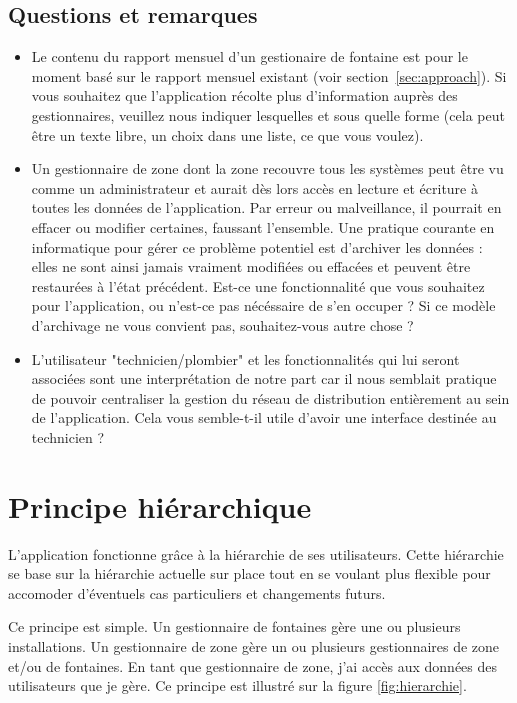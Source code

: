 \documentclass[a4paper, 11pt]{article}
\begin{document}
  \subsection{Questions et remarques}
  \begin{itemize}
    \item Le contenu du rapport mensuel d'un gestionaire de fontaine est pour le moment basé sur le rapport mensuel existant (voir section~\ref{sec:approach}). Si vous souhaitez que l'application récolte plus d'information auprès des gestionnaires, veuillez nous indiquer lesquelles et sous quelle forme (cela peut être un texte libre, un choix dans une liste, ce que vous voulez).
    \item Un gestionnaire de zone dont la zone recouvre tous les systèmes peut être vu comme un administrateur et aurait dès lors accès en lecture et écriture à toutes les données de l'application. Par erreur ou malveillance, il pourrait en effacer ou modifier certaines, faussant l'ensemble. Une pratique courante en informatique pour gérer ce problème potentiel est d'archiver les données : elles ne sont ainsi jamais vraiment modifiées ou effacées et peuvent être restaurées à l'état précédent. Est-ce une fonctionnalité que vous souhaitez pour l'application, ou n'est-ce pas nécéssaire de s'en occuper ? Si ce modèle d'archivage ne vous convient pas, souhaitez-vous autre chose ?
    \item L'utilisateur "technicien/plombier" et les fonctionnalités qui lui seront associées sont une interprétation de notre part car il nous semblait pratique de pouvoir centraliser la gestion du réseau de distribution entièrement au sein de l'application. Cela vous semble-t-il utile d'avoir une interface destinée au technicien ?
  \end{itemize}

  \section{Principe hiérarchique}
    L'application fonctionne grâce à la hiérarchie de ses utilisateurs. Cette hiérarchie se base sur la hiérarchie actuelle sur place tout en se voulant plus flexible pour accomoder d'éventuels cas particuliers et changements futurs.

    Ce principe est simple. Un gestionnaire de fontaines gère une ou plusieurs installations. Un gestionnaire de zone gère un ou plusieurs gestionnaires de zone et/ou de fontaines. En tant que gestionnaire de zone, j'ai accès aux données des utilisateurs que je gère. Ce principe est illustré sur la figure \ref{fig:hierarchie}.
\end{document}
